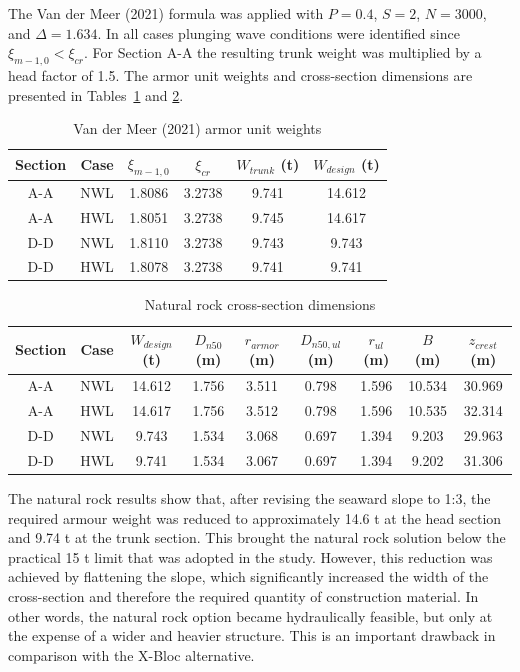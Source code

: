 \documentclass[a4paper, 11pt]{article}
\begin{document}
\hspace{0.5cm} The Van der Meer (2021) formula was applied with $P = 0.4$, $S = 2$, $N = 3000$, and $\Delta = 1.634$. In all cases plunging wave conditions were identified since $\xi_{m-1,0} < \xi_{cr}$. For Section A-A the resulting trunk weight was multiplied by a head factor of 1.5. The armor unit weights and cross-section dimensions are presented in Tables~\ref{tab:vdm} and \ref{tab:rockcs}.

\begin{table}[H]
\centering
\caption{Van der Meer (2021) armor unit weights}
\label{tab:vdm}
\begin{tabular}{cccccc}
\hline
Section & Case & $\xi_{m-1,0}$ & $\xi_{cr}$ & $W_{trunk}$ (t) & $W_{design}$ (t) \\
\hline
A-A & NWL & 1.8086 & 3.2738 & 9.741 & 14.612 \\
A-A & HWL & 1.8051 & 3.2738 & 9.745 & 14.617 \\
D-D & NWL & 1.8110 & 3.2738 & 9.743 & 9.743 \\
D-D & HWL & 1.8078 & 3.2738 & 9.741 & 9.741 \\
\hline
\end{tabular}
\end{table}

\begin{table}[H]
\centering
\caption{Natural rock cross-section dimensions}
\label{tab:rockcs}
\begin{tabular}{ccccccccc}
\hline
Section & Case & $W_{design}$ (t) & $D_{n50}$ (m) & $r_{armor}$ (m) & $D_{n50,ul}$ (m) & $r_{ul}$ (m) & $B$ (m) & $z_{crest}$ (m) \\
\hline
A-A & NWL & 14.612 & 1.756 & 3.511 & 0.798 & 1.596 & 10.534 & 30.969 \\
A-A & HWL & 14.617 & 1.756 & 3.512 & 0.798 & 1.596 & 10.535 & 32.314 \\
D-D & NWL & 9.743  & 1.534 & 3.068 & 0.697 & 1.394 & 9.203  & 29.963 \\
D-D & HWL & 9.741  & 1.534 & 3.067 & 0.697 & 1.394 & 9.202  & 31.306 \\
\hline
\end{tabular}
\end{table}

\hspace{0.5cm}The natural rock results show that, after revising the seaward slope to 1:3, the required armour weight was reduced to approximately 14.6 t at the head section and 9.74 t at the trunk section. This brought the natural rock solution below the practical 15 t limit that was adopted in the study. However, this reduction was achieved by flattening the slope, which significantly increased the width of the cross-section and therefore the required quantity of construction material. In other words, the natural rock option became hydraulically feasible, but only at the expense of a wider and heavier structure. This is an important drawback in comparison with the X-Bloc alternative.
\end{document}
